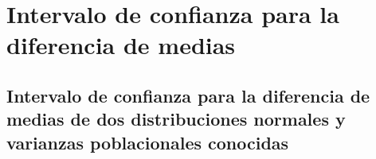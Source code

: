 \documentclass[
  11pt,
]{book}
\theoremstyle{definition}
\theoremstyle{definition}
\theoremstyle{definition}
\theoremstyle{definition}
\theoremstyle{remark}
\begin{document}
\section{Intervalo de confianza para la diferencia de medias}\label{intervalo-de-confianza-para-la-diferencia-de-medias}

\subsection{Intervalo de confianza para la diferencia de medias de dos distribuciones normales y varianzas poblacionales conocidas}\label{intervalo-de-confianza-para-la-diferencia-de-medias-de-dos-distribuciones-normales-y-varianzas-poblacionales-conocidas}

\begin{table}[H]
\centering
\caption{\label{tab:unnamed-chunk-13}Intervalos de confianza para la diferencia de medias de dos distribucones normales y varianzas poblacionales conocidas}
\centering
{}
\end{table}
\end{document}
